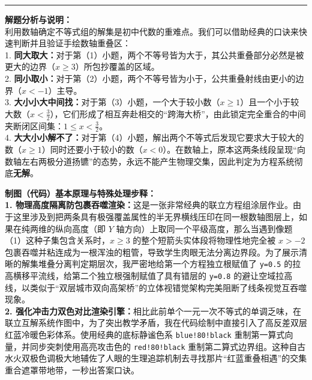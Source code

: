 \vspace{0.6cm}
\hrule
\vspace{0.4cm}

{\small\color{gray}
\textbf{解题分析与说明：}\\
利用数轴确定不等式组的解集是初中代数的重难点。我们可以借助经典的口诀来快速判断并且验证手绘数轴重叠区：\\
1. \textbf{同大取大：}对于第（1）小题，两个不等号皆为大于，其公共重叠部分必然是被更大的边界（$x \geqslant 3$）所包抄覆盖的区域。\\
2. \textbf{同小取小：}对于第（2）小题，两个不等号皆为小于，公共重叠射线由更小的边界（$x < -1$）主导。\\
3. \textbf{大小小大中间找：}对于第（3）小题，一个大于较小数（$x \geqslant 1$）且一个小于较大数（$x < \frac{3}{2}$），它们形成了相互奔赴相交的“跨海大桥”，由此锁定完全重合的中间夹断闭区间集：$1 \leqslant x < \frac{3}{2}$。\\
4. \textbf{大大小小解不了：}对于第（4）小题，解出两个不等式后发现它要求大于较大的数（$x \geqslant 1$）同时还要小于较小的数（$x < 0$）。在数轴上，原本这两条线段呈现“向数轴左右两极分道扬镳”的态势，永远不能产生物理交集，因此判定为方程系统彻底\textbf{无解}。
}

\vspace{0.6cm}

{\small\color{blue!70!black}
\textbf{制图（代码）基本原理与特殊处理步释：}\\
\textbf{1. 物理高度隔离防包裹吞噬渲染：}这是一张非常经典的联立方程组涂层作业。由于这里涉及到把两条具有极强覆盖属性的半无界横线压印在同一根数轴图层上，如果在纯两维的纵向高度（即 $Y$ 轴方向）上取同一个平级高度，那么当遇到像题（1）这种子集包含关系时，$x \geqslant 3$ 的整个短箭头实体段将物理性地完全被 $x > -2$ 包裹吞噬并粘连成为一根浑浊的粗管，导致学生肉眼无法分离边界段。为了展示清晰的解集堆叠分离判定期层次，我严密地给第一个方程独立根赋值了 \texttt{y=0.5} 的拉高横移平流线，给第二个独立根强制赋值了具有错层的 \texttt{y=0.8} 的避让空域拉高线，以类似于“双层城市双向高架桥”的立体视错觉架构完美阻断了线条视觉互吞噬现象。\\
\textbf{2. 强化冲击力双色对比渲染引擎：}相比此前单个一元一次不等式的单调乏味，在联立互解系统作图中，为了突出教学矛盾，我在代码绘制中直接引入了高反差双层红蓝冷暖色彩体系。使用经典的底标静谧色系 \texttt{blue!80!black} 重制第一算式向量，并同步突刺使用高亮攻击色的 \texttt{red!80!black} 重制第二算式边界组。这种自古水火双极色调极大地辅佐了人眼的生理追踪机制去寻找那片“红蓝重叠相遇”的交集重合遮罩带地带，一秒出答案口诀。
}

\newpage



